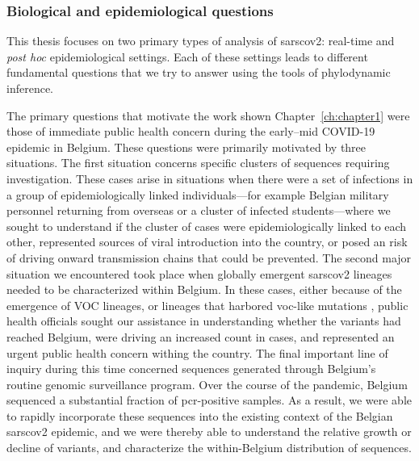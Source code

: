\subsubsection{Biological and epidemiological questions}
This thesis focuses on two primary types of analysis of \gls{sarscov2}: real-time and \textit{post hoc} epidemiological settings.
Each of these settings leads to different fundamental questions that we try to answer using the tools of phylodynamic inference.

The primary questions that motivate the work shown Chapter~\ref{ch:chapter1} were those of immediate public health concern during the early--mid COVID-19 epidemic in Belgium.
These questions were primarily motivated by three situations. 
The first situation concerns specific clusters of sequences requiring investigation.
These cases arise in situations when there were a set of infections in a group of epidemiologically linked individuals---for example Belgian military personnel returning from overseas \citep{pirnay2020study} or a cluster of infected students\citep{vanelslande2022two}---where we sought to understand if the cluster of cases were epidemiologically linked to each other, represented sources of viral introduction into the country, or posed an risk of driving onward transmission chains that could be prevented.
The second major situation we encountered took place when globally emergent \gls{sarscov2} lineages needed to be characterized within Belgium.
In these cases, either because of the emergence of \gls{VOC} lineages, or lineages that harbored \gls{voc}-like mutations \cite{dudas2021emergence}, public health officials sought our assistance in understanding whether the variants had reached Belgium, were driving an increased count in cases, and represented an urgent public health concern withing the country.
The final important line of inquiry during this time concerned sequences generated through Belgium's routine genomic surveillance program.
Over the course of the pandemic, Belgium sequenced a substantial fraction of \gls{pcr}-positive samples.
As a result, we were able to rapidly incorporate these sequences into the existing context of the Belgian \gls{sarscov2} epidemic, and we were thereby able to understand the relative growth or decline of variants, and characterize the within-Belgium distribution of sequences.

